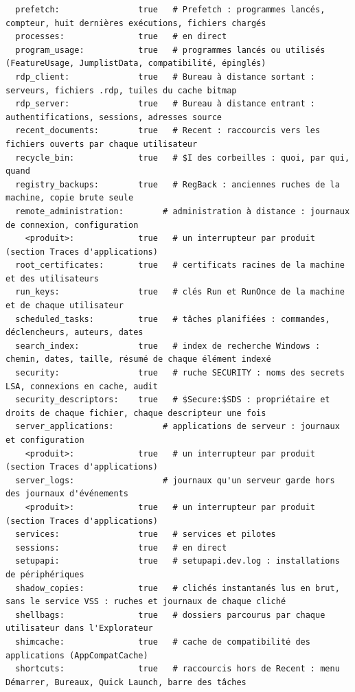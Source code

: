 \documentclass[11pt,a4paper,oneside]{report}
\begin{document}
\begin{lstlisting}
  prefetch:                true   # Prefetch : programmes lancés, compteur, huit dernières exécutions, fichiers chargés
  processes:               true   # en direct
  program_usage:           true   # programmes lancés ou utilisés (FeatureUsage, JumplistData, compatibilité, épinglés)
  rdp_client:              true   # Bureau à distance sortant : serveurs, fichiers .rdp, tuiles du cache bitmap
  rdp_server:              true   # Bureau à distance entrant : authentifications, sessions, adresses source
  recent_documents:        true   # Recent : raccourcis vers les fichiers ouverts par chaque utilisateur
  recycle_bin:             true   # $I des corbeilles : quoi, par qui, quand
  registry_backups:        true   # RegBack : anciennes ruches de la machine, copie brute seule
  remote_administration:        # administration à distance : journaux de connexion, configuration
    <produit>:             true   # un interrupteur par produit (section Traces d'applications)
  root_certificates:       true   # certificats racines de la machine et des utilisateurs
  run_keys:                true   # clés Run et RunOnce de la machine et de chaque utilisateur
  scheduled_tasks:         true   # tâches planifiées : commandes, déclencheurs, auteurs, dates
  search_index:            true   # index de recherche Windows : chemin, dates, taille, résumé de chaque élément indexé
  security:                true   # ruche SECURITY : noms des secrets LSA, connexions en cache, audit
  security_descriptors:    true   # $Secure:$SDS : propriétaire et droits de chaque fichier, chaque descripteur une fois
  server_applications:          # applications de serveur : journaux et configuration
    <produit>:             true   # un interrupteur par produit (section Traces d'applications)
  server_logs:                  # journaux qu'un serveur garde hors des journaux d'événements
    <produit>:             true   # un interrupteur par produit (section Traces d'applications)
  services:                true   # services et pilotes
  sessions:                true   # en direct
  setupapi:                true   # setupapi.dev.log : installations de périphériques
  shadow_copies:           true   # clichés instantanés lus en brut, sans le service VSS : ruches et journaux de chaque cliché
  shellbags:               true   # dossiers parcourus par chaque utilisateur dans l'Explorateur
  shimcache:               true   # cache de compatibilité des applications (AppCompatCache)
  shortcuts:               true   # raccourcis hors de Recent : menu Démarrer, Bureaux, Quick Launch, barre des tâches

\end{lstlisting}
\end{document}
